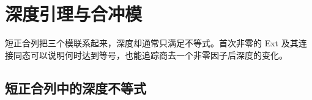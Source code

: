 
\section{深度引理与合冲模}
\label{b3:sec:1603}

短正合列把三个模联系起来，深度却通常只满足不等式。首次非零的 Ext 及其连接同态可以说明何时达到等号，也能追踪商去一个非零因子后深度的变化。


%
%

\subsection{短正合列中的深度不等式}
\label{b3:subsec:1603:01}

